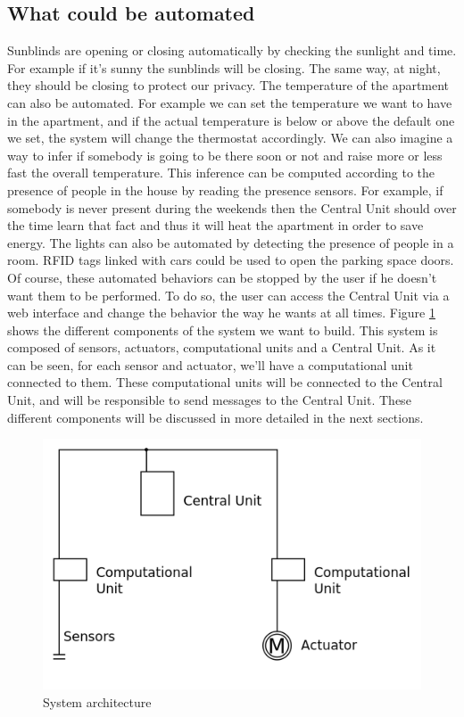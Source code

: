 \documentclass{acm_proc_article-sp}
\begin{document}
\subsection{What could be automated}
Sunblinds are opening or closing automatically by checking the sunlight and time. 
For example if it's sunny the sunblinds will be closing. The same way, at night, they should be closing to protect our privacy.
The temperature of the apartment can also be automated. For example we can set the temperature we want to have in the apartment, 
and if the actual temperature is below or above the default one we set, the system will change the thermostat accordingly. 
We can also imagine a way to infer if somebody is going to be there soon or not and raise more or less fast the overall temperature. 
This inference can be computed according to the presence of people in the house by reading the presence sensors. 
For example, if somebody is never present during the weekends then the Central Unit should over the time learn that fact and thus it will heat the apartment in order to save energy.
The lights can also be automated by detecting the presence of people in a room.
RFID tags linked with cars could be used to open the parking space doors.
Of course, these automated behaviors can be stopped by the user if he doesn't want them to be performed. 
To do so, the user can access the Central Unit via a web interface and change the behavior the way he wants at all times.
Figure \ref{architecture} shows the different components of the system we want to build. This system is composed of sensors, actuators, computational units and a Central Unit. 
As it can be seen, for each sensor and actuator, we'll have a computational unit connected to them. These computational units will be connected to the Central Unit, and will be responsible to send messages to the Central Unit. 
These different components will be discussed in more detailed in the next sections.
				\begin{figure}[htb]
  				\begin{center}
    				\includegraphics[width=\linewidth]{architecture}
    				\caption{System architecture \label{architecture}}
  				\end{center}
				\end{figure}
\end{document}
